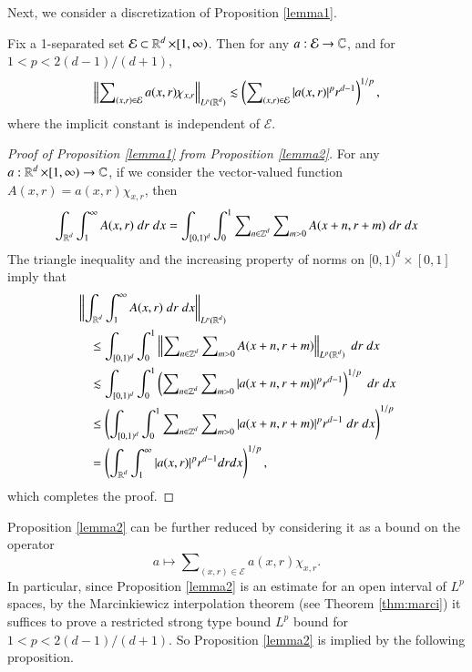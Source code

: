 Next, we consider a discretization of Proposition \ref{lemma1}.

\begin{prop} \label{lemma2}
    Fix a 1-separated set $\mathcal{E} \subset \operatorname{\mathbb{R}}^d \times [1,\infty)$. Then for any $a: \mathcal{E} \to \operatorname{\mathbb{C}}$, and for $1 < p < 2(d-1)/(d+1)$,
    \[ \left\| \sum\nolimits_{(x,r) \in \mathcal{E}} a(x,r) \chi_{x, r} \right\|_{L^p(\operatorname{\mathbb{R}}^d)} \lesssim \left( \sum\nolimits_{(x,r) \in \mathcal{E}} |a(x,r)|^p r^{d-1} \right)^{1/p}, \]
    where the implicit constant is independent of $\mathcal{E}$.
\end{prop}

\begin{proof}[Proof of Proposition \ref{lemma1} from Proposition \ref{lemma2}]
    For any $a: \operatorname{\mathbb{R}}^d \times [1,\infty) \to \operatorname{\mathbb{C}}$, if we consider the vector-valued function $A(x,r) = a(x,r) \chi_{x,r}$, then
    \begin{equation}
      \int_{\operatorname{\mathbb{R}}^d} \int_1^\infty A(x,r)\; dr\; dx = \int_{[0,1)^d} \int_0^1 \sum\nolimits_{n \in \operatorname{\mathbb{Z}}^d} \sum\nolimits_{m > 0} A(x + n,r + m)\; dr\; dx
    \end{equation}
    The triangle inequality and the increasing property of norms on $[0,1)^d \times [0,1]$ imply that
    \begin{equation}
    \begin{split}
    &\left\| \int_{\operatorname{\mathbb{R}}^d} \int_1^\infty A(x,r)\; dr\; dx \right\|_{L^p(\operatorname{\mathbb{R}}^d)}\\
    &\quad \leq \int_{[0,1)^d} \int_0^1 \left\| \sum\nolimits_{n \in \operatorname{\mathbb{Z}}^d} \sum\nolimits_{m > 0} A(x + n,r + m) \right\|_{L^p(\operatorname{\mathbb{R}}^d)}\; dr\; dx\\
    &\quad \lesssim \int_{[0,1)^d} \int_0^1 \left( \sum\nolimits_{n \in \operatorname{\mathbb{Z}}^d} \sum\nolimits_{m > 0} |a(x + n, r + m)|^p r^{d-1} \right)^{1/p}\; dr\; dx\\
    &\quad \leq \left( \int_{[0,1)^d} \int_0^1 \sum\nolimits_{n \in \operatorname{\mathbb{Z}}^d} \sum\nolimits_{m > 0} |a(x + n, r + m)|^p r^{d-1}\; dr\; dx \right)^{1/p}\\
    &\quad = \left( \int_{\operatorname{\mathbb{R}}^d} \int_1^\infty |a(x,r)|^p r^{d-1} dr dx \right)^{1/p},
    \end{split}
    \end{equation}
    which completes the proof.
\end{proof}

Proposition \ref{lemma2} can be further reduced by considering it as a bound on the operator
%
\begin{equation}
  a \mapsto \sum\nolimits_{(x,r) \in \mathcal{E}} a(x,r) \chi_{x,r}.
\end{equation}
%
In particular, since Proposition \ref{lemma2} is an estimate for an open interval of $L^p$ spaces, by the Marcinkiewicz interpolation theorem (see Theorem \ref{thm:marci}) it suffices to prove a restricted strong type bound $L^p$ bound for $1 < p < 2(d-1)/(d+1)$. So Proposition \ref{lemma2} is implied by the following proposition.

